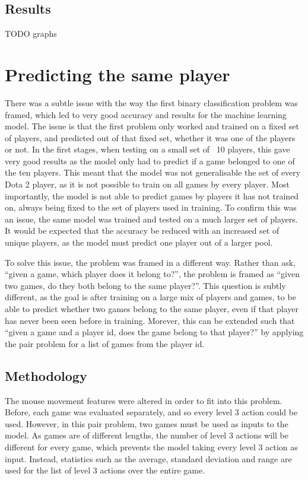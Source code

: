 \documentclass{../sty/SizheArticle}
\begin{document}
\subsection{Results}
TODO graphs



\section{Predicting the same player}
There was a subtle issue with the way the first binary classification problem was framed, which led to very good accuracy and results for the machine learning model. The issue is that the first problem only worked and trained on a fixed set of players, and predicted out of that fixed set, whether it was one of the players or not. In the first stages, when testing on a small set of ~10 players, this gave very good results as the model only had to predict if a game belonged to one of the ten players. This meant that the model was not generalisable the set of every Dota 2 player, as it is not possible to train on all games by every player. Most importantly, the model is not able to predict games by players it has not trained on, always being fixed to the set of players used in training. To confirm this was an issue, the same model was trained and tested on a much larger set of players. It would be expected that the accuracy be reduced with an increased set of unique players, as the model must predict one player out of a larger pool.

To solve this issue, the problem was framed in a different way. Rather than ask, ``given a game, which player does it belong to?'', the problem is framed as ``given two games, do they both belong to the same player?''. This question is subtly different, as the goal is after training on a large mix of players and games, to be able to predict whether two games belong to the same player, even if that player has never been seen before in training. Morever, this can be extended such that ``given a game and a player id, does the game belong to that player?'' by applying the pair problem for a list of games from the player id.

\subsection{Methodology}
The mouse movement features were altered in order to fit into this problem. Before, each game was evaluated separately, and so every level 3 action could be used. However, in this pair problem, two games must be used as inputs to the model. As games are of different lengths, the number of level 3 actions will be different for every game, which prevents the model taking every level 3 action as input. Instead, statistics such as the average, standard deviation and range are used for the list of level 3 actions over the entire game. 
\end{document}
